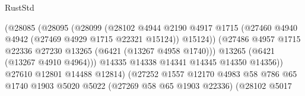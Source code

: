 \begin{lexlean}{RustStd}
\begin{coremodule}
                                              (@28085
                                                (@28095
                                                  (@28099
                                                    (@28102
                                                      @4944
                                                      @2190
                                                      @4917
                                                      @1715
                                                      (@27460
                                                        @4940
                                                        @4942
                                                        (@27469 @4929 @1715 @22321 @15124))
                                                      @15124))
                                                  (@27486
                                                    @4957
                                                    @1715
                                                    @22336
                                                    @27230
                                                    @13265
                                                    (@6421 (@13267 @4958 @1740)))
                                                  @13265
                                                  (@6421 (@13267 @4910 @4964)))
                                                @14335
                                                @14338
                                                @14341
                                                @14345
                                                @14350
                                                @14356))
                                            @27610
                                            @12801
                                            @14488
                                            @12814)
                                          (@27252
                                            @1557
                                            @12170
                                            @4983
                                            @58
                                            @786
                                            @65
                                            @1740
                                            @1903
                                            @5020
                                            @5022
                                            (@27269 @58 @65 @1903 @22336)
                                            (@28102
                                              @5017

\end{coremodule}
\end{lexlean}
